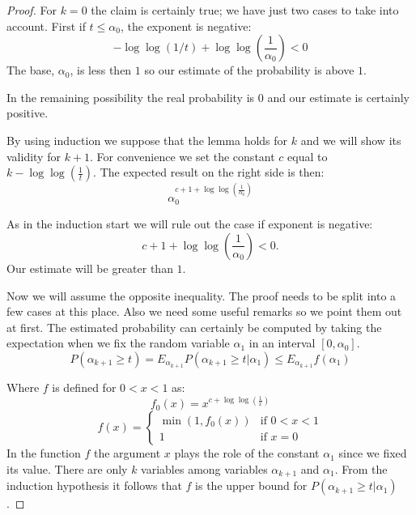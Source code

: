 \begin{proof}
For $k = 0$ the claim is certainly true; we have just two cases to take into account. First if $t \leq \alpha_0$, the exponent is negative:
\begin{displaymath}
-\log \log (1/t) + \log \log \left(\frac{1}{\alpha_0}\right) < 0
\end{displaymath}
The base, $\alpha_0$, is less then $1$ so our estimate of the probability is above $1$. 

In the remaining possibility the real probability is $0$ and our estimate is certainly positive.

By using induction we suppose that the lemma holds for $k$ and we will show its validity for $k + 1$. For convenience we set the constant $c$ equal to $k - \log \log \left(\frac{1}{t}\right)$. The expected result on the right side is then:
\begin{displaymath}
\alpha_0^{c + 1 + \log \log \left(\frac{1}{\alpha_0}\right)}
\end{displaymath}

As in the induction start we will rule out the case if exponent is negative:
\begin{displaymath}
c + 1 + \log \log \left(\frac{1}{\alpha_0}\right) < 0\textit{.}
\end{displaymath}
Our estimate will be greater than $1$. 

Now we will assume the opposite inequality. The proof needs to be split into a few cases at this place. Also we need some useful remarks so we point them out at first. The estimated probability can certainly be computed by taking the expectation when we fix the random variable $\alpha_1$ in an interval $[0, \alpha_0]$.
\begin{displaymath}
P(\alpha_{k+1} \geq t) = E_{\alpha_{k+1}} P(\alpha_{k+1} \geq t | \alpha_1) \leq E_{\alpha_{k+1}} f(\alpha_1)
\end{displaymath}

Where $f$ is defined for $0 < x < 1$ as:
\begin{displaymath}
f_0(x) = x ^ {c + \log \log \left(\frac{1}{x}\right)}
\end{displaymath}
\begin{equation}\label{f-definition}
 f(x) = 
  \begin{cases} 
   \min(1, f_0(x)) & \text{if } 0 < x < 1 \\
   1 & \text{if } x = 0
  \end{cases}
\end{equation}
In the function $f$ the argument $x$ plays the role of the constant $\alpha_1$ since we fixed its value. There are only $k$ variables among variables $\alpha_{k+1}$ and $\alpha_1$. From the induction hypothesis it follows that $f$ is the upper bound for $P(\alpha_{k+1} \geq t | \alpha_1)$.


\end{proof}
